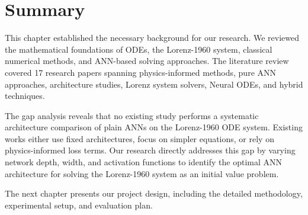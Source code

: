 \section{Summary}

This chapter established the necessary background for our research. We reviewed the mathematical foundations of ODEs, the Lorenz-1960 system, classical numerical methods, and ANN-based solving approaches. The literature review covered 17 research papers spanning physics-informed methods, pure ANN approaches, architecture studies, Lorenz system solvers, Neural ODEs, and hybrid techniques.

The gap analysis reveals that no existing study performs a systematic architecture comparison of plain ANNs on the Lorenz-1960 ODE system. Existing works either use fixed architectures, focus on simpler equations, or rely on physics-informed loss terms. Our research directly addresses this gap by varying network depth, width, and activation functions to identify the optimal ANN architecture for solving the Lorenz-1960 system as an initial value problem.

The next chapter presents our project design, including the detailed methodology, experimental setup, and evaluation plan.

